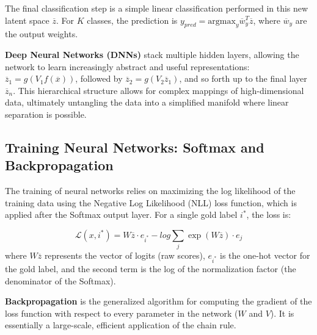 \documentclass{article}
\begin{document}
The final classification step is a simple linear classification performed in this new latent space $\overline{z}$. For $K$ classes, the prediction is $y_{pred} = \text{argmax}_{y} \overline{w}_{y}^{T}\overline{z}$, where $\overline{w}_y$ are the output weights.

\textbf{Deep Neural Networks (DNNs)} stack multiple hidden layers, allowing the network to learn increasingly abstract and useful representations: $\overline{z}_1 = g(V_1f(\overline{x}))$, followed by $\overline{z}_2 = g(V_2\overline{z}_1)$, and so forth up to the final layer $\overline{z}_n$. This hierarchical structure allows for complex mappings of high-dimensional data, ultimately untangling the data into a simplified manifold where linear separation is possible.

\subsection{Training Neural Networks: Softmax and Backpropagation}

The training of neural networks relies on maximizing the log likelihood of the training data using the Negative Log Likelihood (NLL) loss function, which is applied after the Softmax output layer. For a single gold label $i^*$, the loss is:

$$\mathcal{L}(x,i^{*})=W\overline{z}\cdot e_{i^{*}}-log\sum_{j}\exp(W\overline{z})\cdot e_{j}$$
where $W\overline{z}$ represents the vector of logits (raw scores), $e_{i^*}$ is the one-hot vector for the gold label, and the second term is the log of the normalization factor (the denominator of the Softmax).

\textbf{Backpropagation} is the generalized algorithm for computing the gradient of the loss function with respect to every parameter in the network ($W$ and $V$). It is essentially a large-scale, efficient application of the chain rule.
\end{document}

